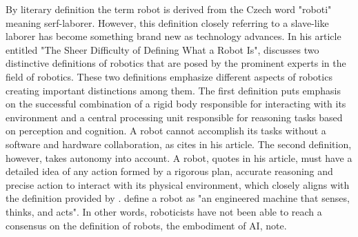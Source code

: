 \documentclass[man]{apa6}
\begin{document}
By literary definition the term robot is derived from the Czech word "roboti" meaning serf-laborer. 
However, this definition closely referring to a slave-like laborer has become something brand new as technology advances.
In his article entitled "The Sheer Difficulty of Defining What a Robot Is",  discusses two distinctive definitions of robotics that are posed by the prominent experts in the field of robotics.
These two definitions emphasize different aspects of robotics creating important distinctions among them.
The first definition puts emphasis on the successful combination of a rigid body responsible for interacting with its environment and a central processing unit responsible for reasoning tasks based on perception and cognition.
A robot cannot accomplish its tasks without a software and hardware collaboration, as  cites in his article.
The second definition, however, takes autonomy into account.
A robot,  quotes in his article, must have a detailed idea of any action formed by a rigorous plan, accurate reasoning and precise action to interact with its physical environment, which closely aligns with the definition provided by \cite{lin}. 
\citeauthor{lin} \citeyear[p.~943]{lin} define a robot as "an engineered machine that senses, thinks, and acts".
In other words, roboticists have not been able  to reach a consensus on the definition of robots, the embodiment of AI,  note.
\par
\end{document}

